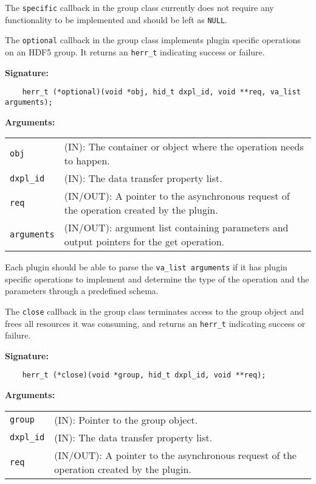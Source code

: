 The \texttt{specific} callback in the group class currently does not require any functionality to be implemented and should be left as \texttt{NULL}.

The \texttt{optional} callback in the group class implements plugin specific operations on an HDF5 group. It returns an \texttt{herr\_t} indicating success or failure. \bigskip

\begin{mdframed}[style=bgbox]
\textbf{Signature:}
\begin{lstlisting}
    herr_t (*optional)(void *obj, hid_t dxpl_id, void **req, va_list arguments);
\end{lstlisting}

\textbf{Arguments:}\\
\begin{tabular}{l p{13.5cm}}
  \texttt{obj} & (IN): The container or object where the operation needs to happen.\\
  \texttt{dxpl\_id} & (IN): The data transfer property list.\\
  \texttt{req} & (IN/OUT): A pointer to the asynchronous request of the operation created by the plugin.\\
  \texttt{arguments} & (IN/OUT): argument list containing parameters and output pointers for the get operation. \\
\end{tabular}
\end{mdframed}

Each plugin should be able to parse the \texttt{va\_list arguments} if it has plugin specific operations to implement and determine the type of the operation and the parameters through a predefined schema. 

The \texttt{close} callback in the group class terminates access to
the group object and frees all resources it was consuming, and returns
an \texttt{herr\_t} indicating success or failure.\bigskip

\begin{mdframed}[style=bgbox]
\textbf{Signature:}
\begin{lstlisting}
    herr_t (*close)(void *group, hid_t dxpl_id, void **req);
\end{lstlisting}

\textbf{Arguments:}\\
\begin{tabular}{l p{13.5cm}}
  \texttt{group} & (IN): Pointer to the group object.\\
  \texttt{dxpl\_id} & (IN): The data transfer property list.\\
  \texttt{req} & (IN/OUT): A pointer to the asynchronous request of the
  operation created by the plugin.\\
\end{tabular}
\end{mdframed}

